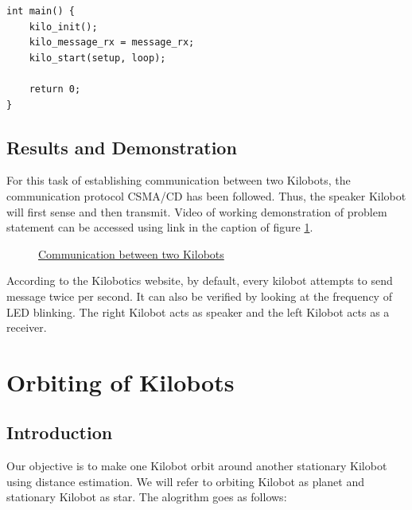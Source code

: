 \begin{verbatim}
int main() {
    kilo_init();
    kilo_message_rx = message_rx;
    kilo_start(setup, loop);

    return 0;
}
\end{verbatim}
\section{Results and Demonstration}
For this task of establishing communication between two Kilobots, the communication protocol CSMA/CD has been followed. Thus, the speaker Kilobot will first sense and then transmit. Video of working demonstration of problem statement can be accessed using link in the caption of figure \ref{fig:communication}.
\begin{figure}[H]
	\centering
	\caption{\href{https://photos.app.goo.gl/h2jCY1WrUYU9xLqG8}{Communication between two Kilobots}}
	\label{fig:communication}
\end{figure}
According to the Kilobotics website, by default, every kilobot attempts to send message twice per second. It can also be verified by looking at the frequency of LED blinking. The right Kilobot acts as speaker and the left Kilobot acts as a receiver.

\chapter{Orbiting of Kilobots}
\section{Introduction}
Our objective is to make one Kilobot orbit around another stationary Kilobot using distance estimation. We will refer to orbiting Kilobot as planet and stationary Kilobot as star. The alogrithm goes as follows:

